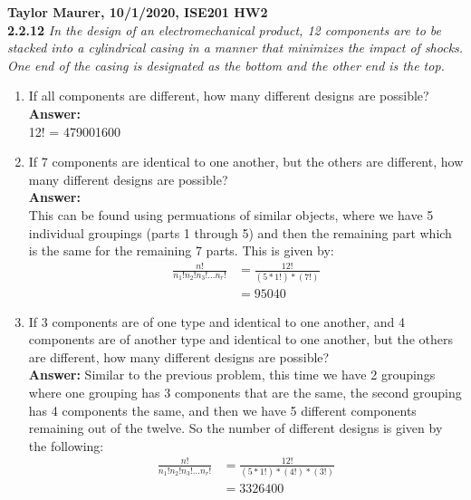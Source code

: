 \documentclass[11pt]{article}
\begin{document}
\textbf{Taylor Maurer, 10/1/2020, ISE201 HW2} \\

\noindent \textbf{2.2.12} \emph{ In the design of an electromechanical product, 12 components are to be stacked into a cylindrical casing in a manner that minimizes the impact of shocks. One end of the casing is designated as the bottom and the other end is the top.}
\begin{enumerate}
\item If all components are different, how many different designs are possible?
\\\textbf{Answer: } \\12! = 479001600
\item If 7 components are identical to one another, but the others are different, how many different designs are possible?
\\\textbf{Answer: } \\This can be found using permuations of similar objects, where we have 5 individual groupings (parts 1 through 5) and then the remaining part which is the same for the remaining 7 parts. This is given by:
\begin{equation}
\begin{split}
\frac{n!}{n_1!n_2!n_3!...n_r!} &= \frac{12!}{(5*1!)*(7!)} \\
&= 95040
\end{split}
\end{equation}

\item If 3 components are of one type and identical to one another, and 4 components are of another type and identical to one another, but the others are different, how many different designs are possible?
\\\textbf{Answer: }Similar to the previous problem, this time we have 2 groupings where one grouping has 3 components that are the same, the second grouping has 4 components the same, and then we have 5 different components remaining out of the twelve. So the number of different designs is given by the following:
\begin{equation}
\begin{split}
\frac{n!}{n_1!n_2!n_3!...n_r!} &= \frac{12!}{(5*1!)*(4!)*(3!)} \\
&= 3326400
\end{split}
\end{equation}
\end{enumerate}
\end{document}

